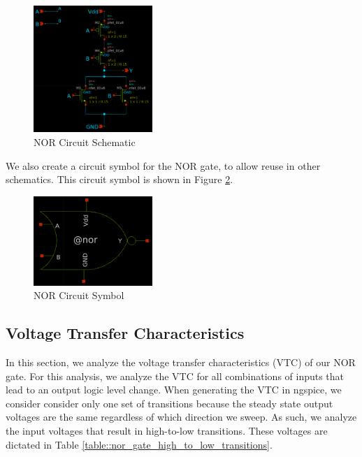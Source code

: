 \documentclass{article}
\begin{document}
	\begin{figure}[H]
		\centerline{\includegraphics[width=0.4\textwidth]{nor_schematic.png}}
		\caption{NOR Circuit Schematic}
		\label{fig::nor_schematic}
	\end{figure}
	
	\noindent We also create a circuit symbol for the NOR gate, to allow reuse in other schematics. This circuit symbol is shown in Figure \ref{fig::nor_symbol}.
	
	\begin{figure}[H]
		\centerline{\includegraphics[width=0.4\textwidth]{nor_symbol.png}}
		\caption{NOR Circuit Symbol}
		\label{fig::nor_symbol}
	\end{figure}

	\subsection{Voltage Transfer Characteristics}
	
	In this section, we analyze the voltage transfer characteristics (VTC) of our NOR gate. For this analysis, we analyze the VTC for all combinations of inputs that lead to an output logic level change. When generating the VTC in ngspice, we consider consider only one set of transitions because the steady state output voltages are the same regardless of which direction we sweep. As such, we analyze the input voltages that result in high-to-low transitions. These voltages are dictated in Table \ref{table::nor_gate_high_to_low_transitions}.
	
\end{document}
